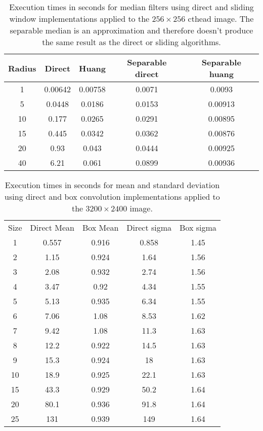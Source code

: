 \documentclass{InsightArticle}
\begin{document}
\begin{table}[phtb]
\centering
\begin{tabular}{ccccc}
\hline
Radius	&	Direct	&	Huang	&	Separable direct	&	Separable huang	\\
\hline
1	&	0.00642	&	0.00758	&	0.0071	&	0.0093	\\
5	&	0.0448	&	0.0186	&	0.0153	&	0.00913	\\
10	&	0.177	&	0.0265	&	0.0291	&	0.00895	\\
15	&	0.445	&	0.0342	&	0.0362	&	0.00876	\\
20	&	0.93	&	0.043	&	0.0444	&	0.00925	\\
40	&	6.21	&	0.061	&	0.0899	&	0.00936	\\
\hline
\hline
\end{tabular}
\caption{Execution times in seconds for median filters using direct and sliding window implementations applied to the $256 \times 256$ cthead image. The separable median is an approximation and therefore doesn't produce the same result as the direct or sliding algorithms.\label{tab:perfRankMedian}}
\end{table}


\begin{table}[phtb]
\centering
\begin{tabular}{ccccc}
\hline
Size  &  Direct Mean &  Box Mean & Direct sigma & Box sigma\\
1	&	0.557	&	0.916	&	0.858	&	1.45	 \\
2	&	1.15	&	0.924	&	1.64	&	1.56	 \\
3	&	2.08	&	0.932	&	2.74	&	1.56	 \\
4	&	3.47	&	0.92	&	4.34	&	1.55	 \\
5	&	5.13	&	0.935	&	6.34	&	1.55	 \\
6	&	7.06	&	1.08	&	8.53	&	1.62	 \\
7	&	9.42	&	1.08	&	11.3	&	1.63	 \\
8	&	12.2	&	0.922	&	14.5	&	1.63	 \\
9	&	15.3	&	0.924	&	18	&	1.63	 \\
10	&	18.9	&	0.925	&	22.1	&	1.63	 \\
15	&	43.3	&	0.929	&	50.2	&	1.64	 \\
20	&	80.1	&	0.936	&	91.8	&	1.64	 \\
25	&	131	&	0.939	&	149	&	1.64	 \\
\hline
\hline
\end{tabular}
\caption{Execution times in seconds for mean and standard deviation using direct and box convolution implementations applied to the $3200 \times 2400$ image.\label{tab:perfBoxConv}}
\end{table}
\end{document}
